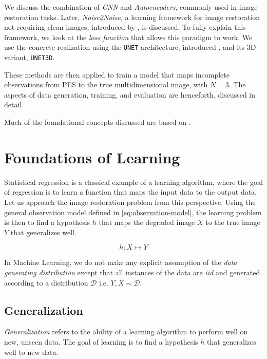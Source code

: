 We discuss the combination of \textit{\gls{CNN}} and \textit{Autoencoders}, commonly used in image restoration tasks. Later, \textit{Noise2Noise}, a learning framework for image restoration not requiring clean images, introduced by \citeauthor{lehtinenNoise2NoiseLearningImage2018}, is discussed. To fully explain this framework, we look at the \textit{loss function} that allows this paradigm to work. We use the concrete realization using the \texttt{UNET} architecture, introduced \citeauthor{ronnebergerUNetConvolutionalNetworks}, and its 3D variant, \texttt{UNET3D}.

These methods are then applied to train a model that maps incomplete observations from \gls{PES} to the true multidimensional image, with $N=3$. The aspects of data generation, training, and evaluation are henceforth, discussed in detail.

Much of the foundational concepts discussed are based on \cite{shalev-shwartzUnderstandingMachineLearning2014a,jamesIntroductionStatisticalLearning2013,tibshiraniElementsStatisticalLearning,goodfellowDeepLearning2016}.

\section{Foundations of Learning}
Statistical regression is a classical example of a learning algorithm, where the goal of regression is to learn a function that maps the input data to the output data.
Let us approach the image restoration problem from this perspective. Using the general observation model defined in \cref{eq:observation-model}, the learning problem is then to find a hypothesis $h$ that maps the degraded image $X$ to the true image $Y$ that generalizes well.

\begin{equation}
    h: X \mapsto Y
\end{equation}

In Machine Learning, we do not make any explicit assumption of the \textit{data generating distribution} except that all instances of the data are \textit{\gls{iid}} and generated according to a distribution $\mathcal{D}$ i.e. $Y, X \sim \mathcal{D}$.

\subsection{Generalization}
\textit{Generalization} refers to the ability of a learning algorithm to perform well on new, unseen data. The goal of learning is to find a hypothesis $h$ that generalizes well to new data. 

